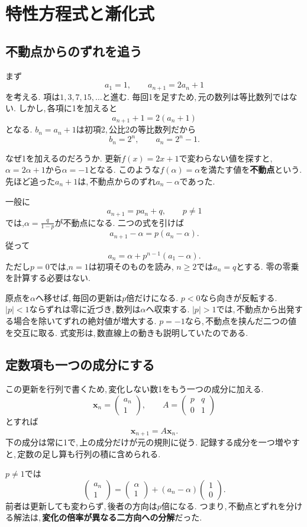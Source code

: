 \section{特性方程式と漸化式}\label{節：特性方程式と漸化式}
\subsection{不動点からのずれを追う}

まず
\[
 a_1=1,\qquad a_{n+1}=2a_n+1
\]
を考える. 項は$1,3,7,15,\ldots$と進む.
毎回1を足すため,\,元の数列は等比数列ではない.
しかし,\,各項に1を加えると
\[
 a_{n+1}+1=2(a_n+1)
\]
となる. $b_n=a_n+1$は初項2,\,公比2の等比数列だから
\[
 b_n=2^n,\qquad a_n=2^n-1.
\]

なぜ1を加えるのだろうか.
更新$f(x)=2x+1$で変わらない値を探すと,
$\alpha=2\alpha+1$から$\alpha=-1$となる.
このような$f(\alpha)=\alpha$を満たす値を\textbf{不動点}という.
先ほど追った$a_n+1$は,\,不動点からのずれ$a_n-\alpha$であった.

一般に
\[
 a_{n+1}=pa_n+q,\qquad p\ne1
\]
では,$\alpha=\frac{q}{1-p}$が不動点になる.
二つの式を引けば
\[
 a_{n+1}-\alpha=p(a_n-\alpha).
\]
従って
\[
 a_n=\alpha+p^{n-1}(a_1-\alpha).
\]
ただし$p=0$では,$n=1$は初項そのものを読み,
$n\ge2$では$a_n=q$とする.
零の零乗を計算する必要はない.

\NewFigFixed
原点を$\alpha$へ移せば,\,毎回の更新は$p$倍だけになる.
$p<0$なら向きが反転する.
$|p|<1$ならずれは零に近づき,\,数列は$\alpha$へ収束する.
$|p|>1$では,\,不動点から出発する場合を除いてずれの絶対値が増大する.
$p=-1$なら,\,不動点を挟んだ二つの値を交互に取る.
式変形は,\,数直線上の動きも説明していたのである.

\subsection{定数項も一つの成分にする}

この更新を行列で書くため,\,変化しない数1をもう一つの成分に加える.
\[
 \boldsymbol x_n=\begin{pmatrix}a_n\\1\end{pmatrix},
 \qquad
 A=\begin{pmatrix}p&q\\0&1\end{pmatrix}
\]
とすれば
\[
 \boldsymbol x_{n+1}=A\boldsymbol x_n.
\]
下の成分は常に1で,\,上の成分だけが元の規則に従う.
記録する成分を一つ増やすと,\,定数の足し算も行列の積に含められる.

$p\ne1$では
\[
 \begin{pmatrix}a_n\\1\end{pmatrix}
 =\begin{pmatrix}\alpha\\1\end{pmatrix}
 +(a_n-\alpha)\begin{pmatrix}1\\0\end{pmatrix}.
\]
前者は更新しても変わらず,\,後者の方向は$p$倍になる.
つまり,\,不動点とずれを分ける解法は,\,\textbf{変化の倍率が異なる二方向への分解}だった.

